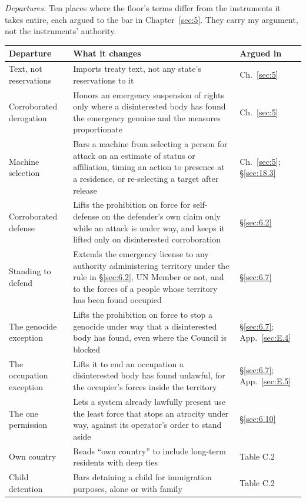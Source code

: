 \emph{Departures.} Ten places where the floor's terms differ from the instruments it takes entire, each argued to the bar in Chapter~\ref{sec:5}. They carry my argument, not the instruments' authority.

\begingroup\small\renewcommand{\arraystretch}{1.12}
\begin{longtable}{@{}>{\raggedright\arraybackslash}p{}>{\raggedright\arraybackslash}p{}>{\raggedright\arraybackslash}p{}@{}}
\hline
\textbf{Departure} & \textbf{What it changes} & \textbf{Argued in} \\
\hline
\endhead
Text, not reservations & Imports treaty text, not any state's reservations to it & Ch.~\ref{sec:5} \\ \hline
Corroborated derogation & Honors an emergency suspension of rights only where a disinterested body has found the emergency genuine and the measures proportionate & Ch.~\ref{sec:5} \\ \hline
Machine selection & Bars a machine from selecting a person for attack on an estimate of status or affiliation, timing an action to presence at a residence, or re-selecting a target after release & Ch.~\ref{sec:5}; \S\ref{sec:18.3} \\ \hline
Corroborated defense & Lifts the prohibition on force for self-defense on the defender's own claim only while an attack is under way, and keeps it lifted only on disinterested corroboration & \S\ref{sec:6.2} \\ \hline
Standing to defend & Extends the emergency license to any authority administering territory under the rule in \S\ref{sec:6.2}, UN Member or not, and to the forces of a people whose territory has been found occupied & \S\ref{sec:6.7} \\ \hline
The genocide exception & Lifts the prohibition on force to stop a genocide under way that a disinterested body has found, even where the Council is blocked & \S\ref{sec:6.7}; App.~\ref{sec:E.4} \\ \hline
The occupation exception & Lifts it to end an occupation a disinterested body has found unlawful, for the occupier's forces inside the territory & \S\ref{sec:6.7}; App.~\ref{sec:E.5} \\ \hline
The one permission & Lets a system already lawfully present use the least force that stops an atrocity under way, against its operator's order to stand aside & \S\ref{sec:6.10} \\ \hline
Own country & Reads “own country” to include long-term residents with deep ties & Table C.2 \\ \hline
Child detention & Bars detaining a child for immigration purposes, alone or with family & Table C.2 \\ \hline
\end{longtable}
\endgroup

